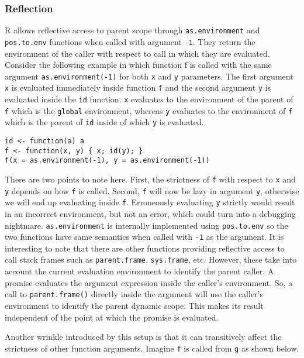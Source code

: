 \documentclass[review,nonacm,screen,acmsmall,anonymous=true]{acmart}
\newcommand{\code}[1]{\lstinline |#1|\xspace}
\begin{document}
\subsubsection{Reflection}

R allows reflective access to parent scope through \code{as.environment} and
\code{pos.to.env} functions when called with argument \code{-1}.
They return the environment of the caller with respect to call in which they are
evaluated. Consider the following example in which function f is called with the
same argument \code{as.environment(-1)} for both \code{x} and \code{y}
parameters. The first argument \code{x} is evaluated immediately inside
function \code{f} and the second argument \code{y} is evaluated inside the
\code{id} function. \code{x} evaluates to the environment of the parent of
\code{f} which is the \code{global} environment, whereas \code{y} evaluates to
the environment of \code{f} which is the parent of \code{id} inside of which
\code{y} is evaluated.
%
\begin{lstlisting}
id <- function(a) a
f <- function(x, y) { x; id(y); }
f(x = as.environment(-1), y = as.environment(-1))
\end{lstlisting}
%
There are two points to note here. First, the strictness of \code{f} with
respect to \code{x} and \code{y} depends on how \code{f} is called. Second,
\code{f} will now be lazy in argument \code{y}, otherwise we will end up
evaluating inside \code{f}. Erroneously evaluating \code{y} strictly would
result in an incorrect environment, but not an error, which could turn into a
debugging nightmare.
\code{as.environment} is internally implemented using \code{pos.to.env} so the
two functions have same semantics when called with \code{-1} as the argument.
It is interesting to note that there are other functions providing reflective
access to call stack frames such as \code{parent.frame}, \code{sys.frame}, etc.
However, these take into account the current evaluation environment to identify
the parent caller. A promise evaluates the argument expression inside the
caller's environment. So, a call to \code{parent.frame()} directly inside the
argument will use the caller's environment to identify the parent dynamic scope.
This makes its result independent of the point at which the promise is
evaluated.

Another wrinkle introduced by this setup is that it can transitively affect the
strictness of other function arguments. Imagine \code{f} is called from \code{g}
as shown below.
\end{document}
